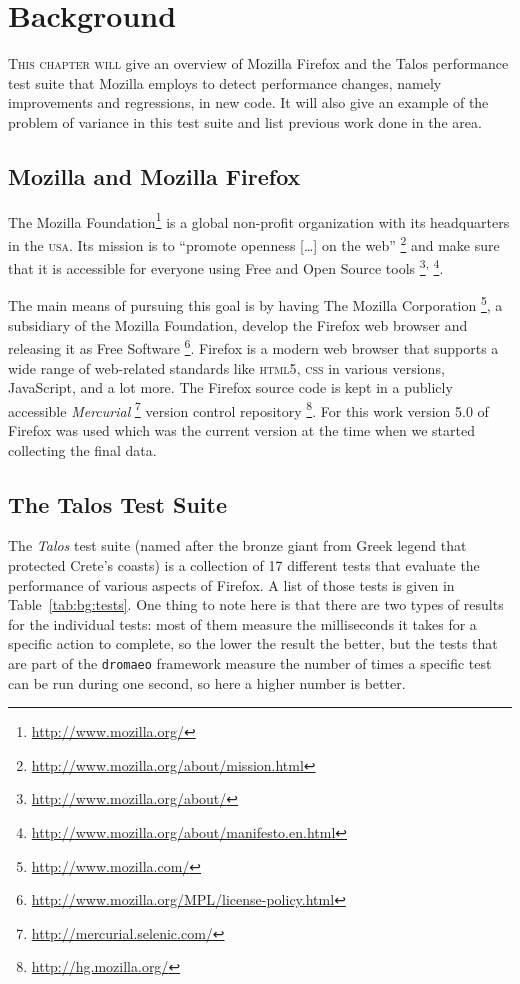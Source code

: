 \chapter{Background} %
\label{cha:background}

\lettrine{T}{his chapter will}
give an overview of Mozilla Firefox and the Talos performance test suite that
Mozilla employs to detect performance changes, namely improvements and
regressions, in new code. It will also give an example of the problem of
variance in this test suite and list previous work done in the area.

\section{Mozilla and Mozilla Firefox} %
\label{sec:bg:firefox}

The Mozilla Foundation\footnote{\url{http://www.mozilla.org/}} is a global
non-profit organization with its headquarters in the \textsc{usa}. Its mission
is to ``promote openness [\ldots] on the web''%
\footnote{\url{http://www.mozilla.org/about/mission.html}}
and make sure that it is accessible for everyone using Free and Open Source
tools%
\footnote{\url{http://www.mozilla.org/about/}}\textsuperscript{,}%
\footnote{\url{http://www.mozilla.org/about/manifesto.en.html}}.

The main means of pursuing this goal is by having The Mozilla Corporation%
\footnote{\url{http://www.mozilla.com/}}, a subsidiary of the Mozilla
Foundation, develop the Firefox web browser and releasing it as Free Software%
\footnote{\url{http://www.mozilla.org/MPL/license-policy.html}}. Firefox is a
modern web browser that supports a wide range of web-related standards like
\textsc{html5}, \textsc{css} in various versions, JavaScript, and a lot more.
The Firefox source code is kept in a publicly accessible \emph{Mercurial}%
\footnote{\url{http://mercurial.selenic.com/}}
version control repository%
\footnote{\url{http://hg.mozilla.org/}}.
For this work version 5.0 of Firefox was used which was the current version at
the time when we started collecting the final data.

\section{The Talos Test Suite} %
\label{sec:bg:talos}

The \emph{Talos} test suite (named after the bronze giant from Greek legend
that protected Crete's coasts) is a collection of 17 different tests that
evaluate the performance of various aspects of Firefox. A list of those tests
is given in Table~\ref{tab:bg:tests}. One thing to note here is that there are
two types of results for the individual tests: most of them measure the
milliseconds it takes for a specific action to complete, so the lower the
result the better, but the tests that are part of the \texttt{dromaeo}
framework measure the number of times a specific test can be run during one
second, so here a higher number is better.

